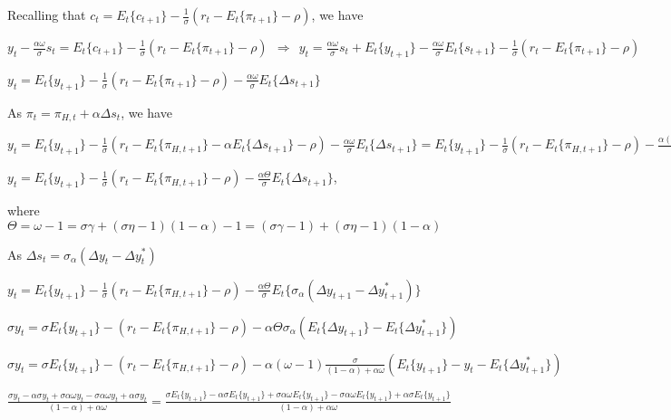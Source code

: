 \documentclass[
]{article}
\begin{document}
\vspace{8pt}

Recalling that
\(\displaystyle c_t=E_t\{c_{t+1}\}-\frac{1}{\sigma}(r_t-E_t\{\pi_{t+1}\}-\rho)\),
we have

\(\displaystyle y_t - \frac{\alpha \omega}{\sigma}s_t = E_t\{c_{t+1}\}-\frac{1}{\sigma}(r_t-E_t\{\pi_{t+1}\}-\rho) \ \ \Rightarrow \ \ y_t = \frac{\alpha \omega}{\sigma}s_t + E_t\{y_{t+1}\} - \frac{\alpha \omega}{\sigma}E_t\{s_{t+1}\} -\frac{1}{\sigma}(r_t-E_t\{\pi_{t+1}\}-\rho)\)

\(\displaystyle y_t = E_t\{y_{t+1}\} -\frac{1}{\sigma}(r_t-E_t\{\pi_{t+1}\}-\rho)- \frac{\alpha \omega}{\sigma}E_t\{\Delta s_{t+1}\}\)

As \(\pi_t = \pi_{H,t}+\alpha\Delta s_t\), we have

\(\displaystyle y_t = E_t\{y_{t+1}\} -\frac{1}{\sigma}(r_t-E_t\{\pi_{H,t+1}\}-\alpha E_t\{\Delta s_{t+1} \} -\rho)- \frac{\alpha \omega}{\sigma}E_t\{\Delta s_{t+1}\} = E_t\{y_{t+1}\} -\frac{1}{\sigma}(r_t-E_t\{\pi_{H,t+1}\} -\rho)- \frac{\alpha (\omega-1)}{\sigma}E_t\{\Delta s_{t+1}\}\)

\(\displaystyle y_t = E_t\{y_{t+1}\} -\frac{1}{\sigma}(r_t-E_t\{\pi_{H,t+1}\} -\rho)- \frac{\alpha \Theta}{\sigma}E_t\{\Delta s_{t+1}\}\),

where
\(\Theta = \omega-1 = \sigma \gamma + (\sigma \eta - 1)(1-\alpha)-1=(\sigma \gamma-1) + (\sigma \eta - 1)(1-\alpha)\)

As \(\Delta s_t= \sigma_\alpha (\Delta y_t - \Delta y_t^*)\)

\(\displaystyle y_t = E_t\{y_{t+1}\} -\frac{1}{\sigma}(r_t-E_t\{\pi_{H,t+1}\} -\rho)- \frac{\alpha \Theta}{\sigma}E_t\{\sigma_\alpha (\Delta y_{t+1} - \Delta y_{t+1}^*)\}\)

\(\displaystyle \sigma y_t = \sigma E_t\{y_{t+1}\} -(r_t-E_t\{\pi_{H,t+1}\} -\rho)- \alpha \Theta \sigma_\alpha (E_t\{ \Delta y_{t+1} \} - E_t\{\Delta y_{t+1}^*\})\)

\(\displaystyle \sigma y_t=\sigma E_t\{y_{t+1}\} -(r_t-E_t\{\pi_{H,t+1}\} -\rho)- \alpha (\omega-1) \frac{\sigma}{(1-\alpha)+\alpha \omega} (E_t\{ y_{t+1} \} -y_t - E_t\{\Delta y_{t+1}^*\})\)

\(\displaystyle \frac{\sigma y_t -\alpha \sigma y_t + \sigma \alpha \omega y_t -\sigma \alpha \omega y_t + \alpha \sigma y_t}{(1-\alpha)+\alpha \omega}= \frac{\sigma E_t\{y_{t+1}\} -\alpha \sigma E_t\{y_{t+1}\} + \sigma \alpha \omega E_t\{y_{t+1}\} -\sigma \alpha \omega E_t\{y_{t+1}\} + \alpha \sigma E_t\{y_{t+1}\}}{(1-\alpha)+\alpha \omega}\)
\end{document}
